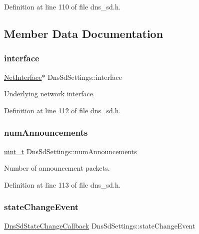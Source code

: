 Definition at line 110 of file dns\+\_\+sd.\+h.



\subsection{Member Data Documentation}
\mbox{\label{structDnsSdSettings_a44bec3533618076ff5b1695be49b873d}} 
\subsubsection{\texorpdfstring{interface}{interface}}
{\footnotesize\ttfamily \hyperlink{net_8h_a2234db8911a1148c9159979d8f5e0d6b}{Net\+Interface}$\ast$ Dns\+Sd\+Settings\+::interface}



Underlying network interface. 



Definition at line 112 of file dns\+\_\+sd.\+h.

\mbox{\label{structDnsSdSettings_a0538afd7122031fbd37245a78655d878}} 
\subsubsection{\texorpdfstring{num\+Announcements}{numAnnouncements}}
{\footnotesize\ttfamily \hyperlink{compiler__port_8h_a12a1e9b3ce141648783a82445d02b58d}{uint\+\_\+t} Dns\+Sd\+Settings\+::num\+Announcements}



Number of announcement packets. 



Definition at line 113 of file dns\+\_\+sd.\+h.

\mbox{\label{structDnsSdSettings_a6c414366d64ac6a010da9aa6b5b7ad20}} 
\subsubsection{\texorpdfstring{state\+Change\+Event}{stateChangeEvent}}
{\footnotesize\ttfamily \hyperlink{dns__sd_8h_aaac6c7f0600a0f8799c102efe1c65be4}{Dns\+Sd\+State\+Change\+Callback} Dns\+Sd\+Settings\+::state\+Change\+Event}



